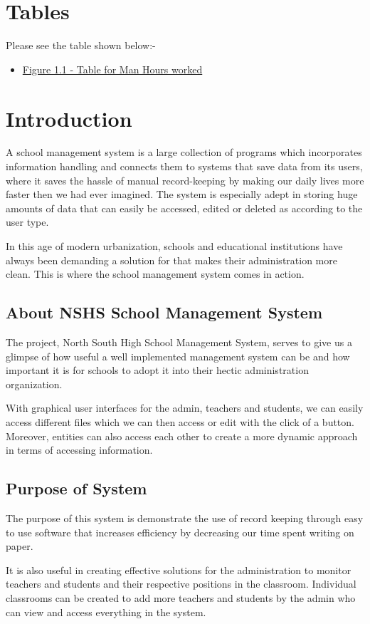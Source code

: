 \documentclass[a4paper,12pt]{article}
\begin{document}
\newpage

\section{Tables}
\enlargethispage{\baselineskip}
Please see the table shown below:- 
\begin{itemize}
    \item \hyperref[sec:projsec]{Figure 1.1 - Table for Man Hours worked}
\end{itemize}

\section{Introduction}
\enlargethispage{\baselineskip}
A school management system is a large collection of programs which incorporates information handling and connects them to systems that save data from its users, where it saves the hassle of manual record-keeping by making our daily lives more faster then we had ever imagined. The system is especially adept in storing huge amounts of data that can easily be accessed, edited or deleted as according to the user type. \par In this age of modern urbanization, schools and educational institutions have always been demanding a solution for that makes their administration more clean. This is where the school management system comes in action.

\subsection{About NSHS School Management System}
\enlargethispage{\baselineskip}
The project, North South High School Management System, serves to give us a glimpse of how useful a well implemented management system can be and how important it is for schools to adopt it into their hectic administration organization.
\par With graphical user interfaces for the admin, teachers and students, we can easily access different files which we can then access or edit with the click of a button. Moreover, entities can also access each other to create a more dynamic approach in terms of accessing information.

\subsection{Purpose of System}
\enlargethispage{\baselineskip}
The purpose of this system is demonstrate the use of record keeping through easy to use software that increases efficiency by decreasing our time spent writing on paper. \par It is also useful in creating effective solutions for the administration to monitor teachers and students and their respective positions in the classroom. Individual classrooms can be created to add more teachers and students by the admin who can view and access everything in the system.
\newpage
\end{document}
